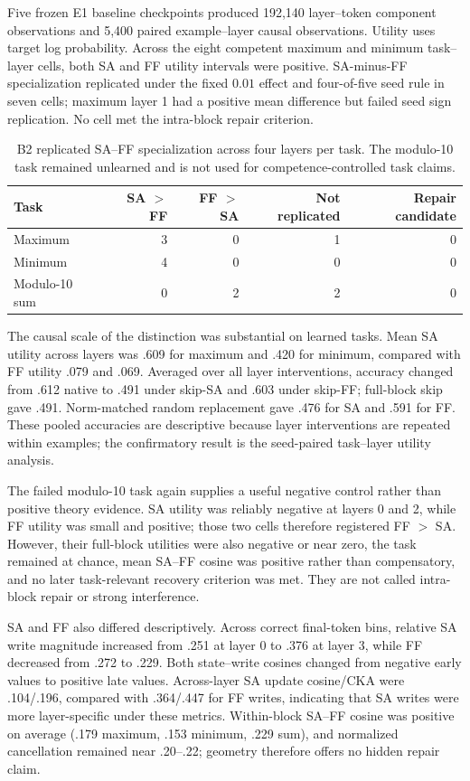 \documentclass[10pt]{article}
\begin{document}
Five frozen E1 baseline checkpoints produced 192,140 layer--token component observations and 5,400 paired example--layer causal observations. Utility uses target log probability. Across the eight competent maximum and minimum task--layer cells, both SA and FF utility intervals were positive. SA-minus-FF specialization replicated under the fixed $0.01$ effect and four-of-five seed rule in seven cells; maximum layer 1 had a positive mean difference but failed seed sign replication. No cell met the intra-block repair criterion.

\begin{table}[ht]
\centering
\caption{B2 replicated SA--FF specialization across four layers per task. The modulo-10 task remained unlearned and is not used for competence-controlled task claims.}
\begin{tabular}{lrrrr}
\toprule
Task & SA $>$ FF & FF $>$ SA & Not replicated & Repair candidate \\
\midrule
Maximum & 3 & 0 & 1 & 0 \\
Minimum & 4 & 0 & 0 & 0 \\
Modulo-10 sum & 0 & 2 & 2 & 0 \\
\bottomrule
\end{tabular}
\end{table}

The causal scale of the distinction was substantial on learned tasks. Mean SA utility across layers was .609 for maximum and .420 for minimum, compared with FF utility .079 and .069. Averaged over all layer interventions, accuracy changed from .612 native to .491 under skip-SA and .603 under skip-FF; full-block skip gave .491. Norm-matched random replacement gave .476 for SA and .591 for FF. These pooled accuracies are descriptive because layer interventions are repeated within examples; the confirmatory result is the seed-paired task--layer utility analysis.

The failed modulo-10 task again supplies a useful negative control rather than positive theory evidence. SA utility was reliably negative at layers 0 and 2, while FF utility was small and positive; those two cells therefore registered FF $>$ SA. However, their full-block utilities were also negative or near zero, the task remained at chance, mean SA--FF cosine was positive rather than compensatory, and no later task-relevant recovery criterion was met. They are not called intra-block repair or strong interference.

SA and FF also differed descriptively. Across correct final-token bins, relative SA write magnitude increased from .251 at layer 0 to .376 at layer 3, while FF decreased from .272 to .229. Both state--write cosines changed from negative early values to positive late values. Across-layer SA update cosine/CKA were .104/.196, compared with .364/.447 for FF writes, indicating that SA writes were more layer-specific under these metrics. Within-block SA--FF cosine was positive on average (.179 maximum, .153 minimum, .229 sum), and normalized cancellation remained near .20--.22; geometry therefore offers no hidden repair claim.
\end{document}
